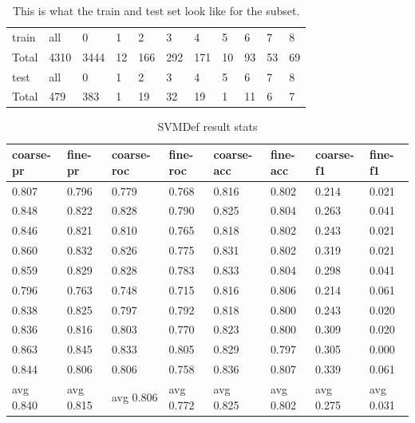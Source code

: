 \documentclass[ms]{nuthesis}
\begin{document}
\FloatBarrier
\begin{table}[h]
  \centering
  \begin{tabular}{|l||l||l||l||l||l||l||l||l||l||l|}\toprule
    train & all & 0 & 1 & 2 & 3 & 4 & 5 & 6 & 7 & 8 \\
    Total & 4310 & 3444 & 12 & 166 & 292 & 171 & 10 & 93 & 53 & 69 \\ \midrule
    test & all & 0 & 1 & 2 & 3 & 4 & 5 & 6 & 7 & 8 \\
    Total & 479 & 383 & 1 & 19 & 32 & 19 & 1 & 11 & 6 & 7 \\
 \bottomrule
  \end{tabular}
  \caption{This is what the train and test set look like for the subset.}
  \label{tab:TrainTest}
\end{table}
\FloatBarrier

\FloatBarrier
\begin{table}[h]
\centering
\begin{tabular}{|l||l||l||l||l||l||l||l|}\toprule
coarse-pr & fine-pr & coarse-roc & fine-roc & coarse-acc & fine-acc & coarse-f1 & fine-f1 \\ \midrule
0.807 & 0.796 & 0.779 & 0.768 & 0.816 & 0.802 & 0.214 & 0.021 \\
0.848 & 0.822 & 0.828 & 0.790 & 0.825 & 0.804 & 0.263 & 0.041 \\
0.846 & 0.821 & 0.810 & 0.765 & 0.818 & 0.802 & 0.243 & 0.021 \\
0.860 & 0.832 & 0.826 & 0.775 & 0.831 & 0.802 & 0.319 & 0.021 \\
0.859 & 0.829 & 0.828 & 0.783 & 0.833 & 0.804 & 0.298 & 0.041 \\
0.796 & 0.763 & 0.748 & 0.715 & 0.816 & 0.806 & 0.214 & 0.061 \\
0.838 & 0.825 & 0.797 & 0.792 & 0.818 & 0.800 & 0.243 & 0.020 \\
0.836 & 0.816 & 0.803 & 0.770 & 0.823 & 0.800 & 0.309 & 0.020 \\
0.863 & 0.845 & 0.833 & 0.805 & 0.829 & 0.797 & 0.305 & 0.000 \\
0.844 & 0.806 & 0.806 & 0.758 & 0.836 & 0.807 & 0.339 & 0.061 \\
avg 0.840 & avg 0.815 & avg 0.806 & avg 0.772 & avg 0.825 & avg 0.802 & avg 0.275 & avg 0.031 \\ \bottomrule
\end{tabular}
\caption{SVMDef result stats}
\label{tab:SVMDefResStats}
\end{table}
\FloatBarrier
\end{document}
